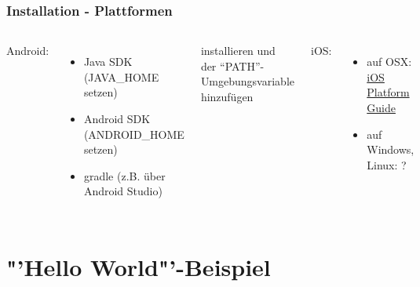 \documentclass[xcolor=dvipsnames]{beamer}
\begin{document}
\begin{frame}\frametitle{Installation - Plattformen}
	\begin{columns}[t,onlytextwidth]
			Android:
			\begin{itemize}
				\item Java SDK (JAVA\_HOME setzen)
				\item Android SDK (ANDROID\_HOME setzen)
				\item gradle (z.B. über Android Studio)
			\end{itemize}
			installieren und der "`PATH"'-Umgebungsvariable hinzufügen\newline
			
			iOS:
			\begin{itemize}
				\item auf OSX: \href{https://cordova.apache.org/docs/en/latest/guide/platforms/ios/index.html}{\textcolor{cordovablue}{iOS Platform Guide}}
				\item auf Windows, Linux: {\LARGE \frownie} ?
			\end{itemize}
		\centering
		\includegraphics[width=0.9\textwidth,valign=t]{pictures/cordova_device_is_ready}
	\end{columns}
\end{frame}

\section{"'Hello World"'-Beispiel}
\end{document}
